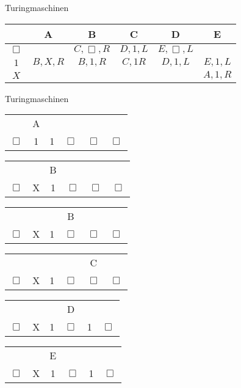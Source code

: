 \begin{frame}{Turingmaschinen}
  \begin{center}
    \begin{tabular}{cccccc}
      \toprule
      & A & B & C & D & E \\
      \midrule
      $\Box$ & & $C,\Box ,R$ & $D, 1, L$ & $E, \Box , L$ & \\
      $1$ & $B, X, R$ & $B, 1, R$ & $C, 1 R$ & $D, 1, L$ & $E, 1, L$ \\
      $X$ & & & & & $A, 1, R$ \\
      \bottomrule
    \end{tabular}
  \end{center}
\end{frame}

\begin{frame}{Turingmaschinen}
  \begin{minipage}[t!]{0.5\textwidth}
    \begin{center}
      \begin{tabular}{cccccc}
        & A & & & & \\
        $\Box$ & 1 & 1 & $\Box$ & $\Box$ & $\Box$ \\
      \end{tabular}
      \begin{tabular}{cccccc}
        & & B & & & \\
        $\Box$ & X & 1 & $\Box$ & $\Box$ & $\Box$ \\
      \end{tabular}
      \begin{tabular}{cccccc}
        & & & B & & \\
        $\Box$ & X & 1 & $\Box$ & $\Box$ & $\Box$ \\
      \end{tabular}
      \begin{tabular}{cccccc}
        & & & & C & \\
        $\Box$ & X & 1 & $\Box$ & $\Box$ & $\Box$ \\
      \end{tabular}
      \begin{tabular}{cccccc}
        & & & D & & \\
        $\Box$ & X & 1 & $\Box$ & 1 & $\Box$ \\
      \end{tabular}
      \begin{tabular}{cccccc}
        & & E & & & \\
        $\Box$ & X & 1 & $\Box$ & 1 & $\Box$ \\

\end{tabular}
\end{center}
\end{minipage}
\end{frame}
